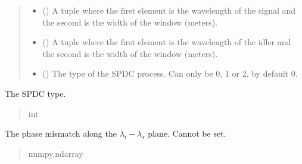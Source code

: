 \documentclass[a4paper,10pt,english]{sphinxmanual}
\begin{document}
\begin{fulllineitems}
\begin{quote}
\begin{description}
\begin{itemize}
\item {} 
\sphinxAtStartPar
{} () \textendash{} A tuple where the first element is the wavelength of the signal and the second is the width of the window (meters).

\item {} 
\sphinxAtStartPar
{} () \textendash{} A tuple where the first element is the wavelength of the idler and the second is the width of the window (meters).

\item {} 
\sphinxAtStartPar
{} (\sphinxstyleliteralemphasis{\sphinxupquote{, }}) \textendash{} The type of the SPDC process. Can only be 0, 1 or 2, by default 0.

\end{itemize}

\end{description}\end{quote}

\begin{fulllineitems}
\label{\detokenize{experiment:pyjsa.experiment.Experiment.SPDC_type}}
\pysigstartsignatures
{}
\pysigstopsignatures
\sphinxAtStartPar
The SPDC type.
\begin{quote}\begin{description}
\sphinxAtStartPar
int

\end{description}\end{quote}

\end{fulllineitems}


\begin{fulllineitems}
\label{\detokenize{experiment:pyjsa.experiment.Experiment.delta_k}}
\pysigstartsignatures
{}
\pysigstopsignatures
\sphinxAtStartPar
The phase mismatch along the \(\lambda_i-\lambda_s\) plane. Cannot be set.
\begin{quote}\begin{description}
\sphinxAtStartPar
numpy.ndarray


\end{description}
\end{quote}
\end{fulllineitems}
\end{fulllineitems}
\end{document}
